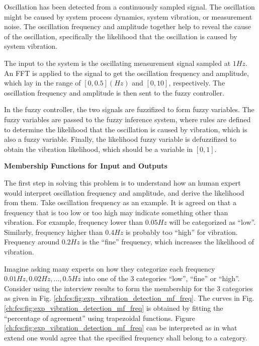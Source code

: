 \begin{shortbox}

Oscillation has been detected from a continuously sampled signal. The oscillation might be caused by system process dynamics, system vibration, or measurement noise. The oscillation frequency and amplitude together help to reveal the cause of the oscillation, specifically the likelihood that the oscillation is caused by system vibration.

The input to the system is the oscillating measurement signal sampled at $1Hz$. An FFT is applied to the signal to get the oscillation frequency and amplitude, which lay in the range of $[0, 0.5] (Hz)$ and $[0, 10]$, respectively. The oscillation frequency and amplitude is then sent to the fuzzy controller.

In the fuzzy controller, the two signals are fuzzifized to form fuzzy variables. The fuzzy variables are passed to the fuzzy inference system, where rules are defined to determine the likelihood that the oscillation is caused by vibration, which is also a fuzzy variable. Finally, the likelihood fuzzy variable is defuzzifized to obtain the vibration likelihood, which should be a variable in $[0,1]$.

\end{shortbox}

\vspace{0.1in}
\noindent \textbf{Membership Functions for Input and Outputs}
\vspace{0.1in}

The first step in solving this problem is to understand how an human expert would interpret oscillation frequency and amplitude, and derive the likelihood from them. Take oscillation frequency as an example. It is agreed on that a frequency that is too low or too high may indicate something other than vibration. For example, frequency lower than $0.05Hz$ will be categorized as ``low''. Similarly, frequency higher than $0.4Hz$ is probably too ``high'' for vibration. Frequency around $0.2Hz$ is the ``fine'' frequency, which increases the likelihood of vibration.

Imagine asking many experts on how they categorize each frequency $0.01Hz, 0.02Hz, ..., 0.5Hz$ into one of the 3 categories ``low'', ``fine'' or ``high''. Consider using the interview results to form the membership for the 3 categories as given in Fig. \ref{ch:fcs:fig:exp_vibration_detection_mf_freq}. The curves in Fig. \ref{ch:fcs:fig:exp_vibration_detection_mf_freq} is obtained by fitting the ``percentage of agreement'' using trapezoidal functions. Figure \ref{ch:fcs:fig:exp_vibration_detection_mf_freq} can be interpreted as in what extend one would agree that the specified frequency shall belong to a category.

